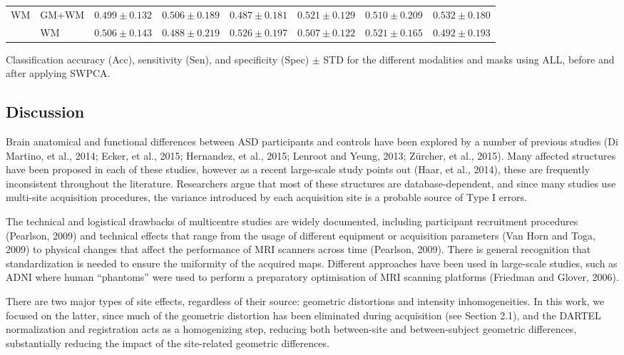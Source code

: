\begin{bigtable}
\begin{tabularx}{\linewidth}{ll|XXX|XXX}
		\midrule
		\multirow{2}{*}{\ac{WM}} &GM+WM &
		$ 0.499 \pm 0.132 $ & $ 0.506 \pm 0.189 $ & $ 0.487 \pm 0.181 $ & $ 0.521 \pm 0.129 $ & $ 0.510 \pm 0.209 $ &  $ 0.532 \pm 0.180 $ \\
		&
		WM &
		$ 0.506 \pm 0.143 $ & $ 0.488 \pm 0.219 $ & $ 0.526 \pm 0.197 $ & $ 0.507 \pm 0.122 $ & $ 0.521 \pm 0.165 $ &   $ 0.492 \pm 0.193 $ \\
		\bottomrule
	\end{tabularx}
	\caption[Classification accuracy (Acc), sensitivity (Sen), and specificity (Spec) $\pm$ STD for the different modalities and masks using ALL, before and after applying \acs{SWPCA}.]{Classification accuracy (Acc), sensitivity (Sen), and specificity (Spec) $\pm$ STD for the different modalities and masks using ALL, before and after applying \ac{SWPCA}.}
	\label{tab:swpcaALL}
\end{bigtable}

\subsection{Discussion}
Brain anatomical and functional differences between ASD participants and
controls have been explored by a number of previous studies (Di
Martino, et al., 2014; Ecker, et al., 2015; Hernandez, et al., 2015;
Lenroot and Yeung, 2013; Zürcher, et al., 2015). Many affected
structures have been proposed in each of these studies, however as a
recent large-scale study points out (Haar, et al., 2014), these are
frequently inconsistent throughout the literature. Researchers argue
that most of these structures are database-dependent, and since many
studies use multi-site acquisition procedures, the variance introduced
by each acquisition site is a probable source of Type I errors. 


	The technical and logistical drawbacks of multicentre studies are widely
	documented, including participant recruitment procedures (Pearlson,
	2009) and technical effects that range from the usage of different
	equipment or acquisition parameters (Van Horn and Toga, 2009) to
	physical changes that affect the performance of \ac{MRI} scanners across
	time (Pearlson, 2009). There is general recognition that
	standardization is needed to ensure the uniformity of the acquired
	maps. Different approaches have been used in large-scale studies, such
	as \ac{ADNI} where human
	“phantoms” were used to perform a preparatory optimisation of \ac{MRI}
	scanning platforms (Friedman and Glover, 2006). 


	There are two major types of site effects, regardless of their source:
	geometric distortions and intensity inhomogeneities. In this work, we
	focused on the latter, since much of the geometric distortion has been
	eliminated during acquisition (see Section 2.1), and the DARTEL
	normalization and registration acts as a homogenizing step, reducing
	both between-site and between-subject geometric differences,
	substantially reducing the impact of the site-related geometric
	differences. 


